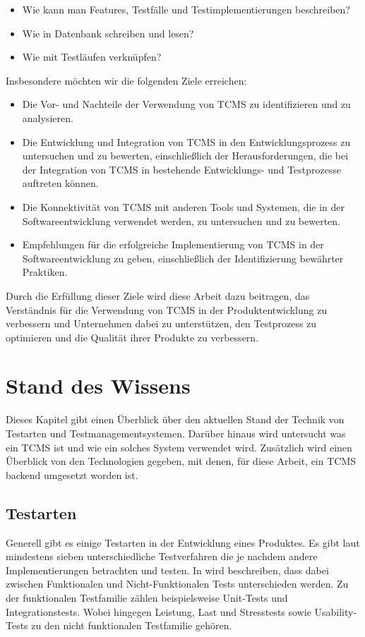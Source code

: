 \documentclass[a4paper, fontsize=11pt, parskip=half, twoside]{scrreprt}
\begin{document}
	\begin{itemize}
		\item Wie kann man Features, Testfälle und Testimplementierungen beschreiben? 
		\item Wie in Datenbank schreiben und lesen? 
		\item Wie mit Testläufen verknüpfen?
	\end{itemize}
	
	Insbesondere möchten wir die folgenden Ziele erreichen:
	
	\begin{itemize}
		\item Die Vor- und Nachteile der Verwendung von \ac{TCMS} zu identifizieren und zu analysieren.
		\item Die Entwicklung und Integration von \ac{TCMS} in den Entwicklungsprozess zu untersuchen und zu bewerten, einschließlich der Herausforderungen, die bei der Integration von \ac{TCMS} in bestehende Entwicklungs- und Testprozesse auftreten können.
		\item Die Konnektivität von \ac{TCMS} mit anderen Tools und Systemen, die in der Softwareentwicklung verwendet werden, zu untersuchen und zu bewerten.
		\item Empfehlungen für die erfolgreiche Implementierung von \ac{TCMS} in der Softwareentwicklung zu geben, einschließlich der Identifizierung bewährter Praktiken.
	\end{itemize}
	
	Durch die Erfüllung dieser Ziele wird diese Arbeit dazu beitragen, das Verständnis für die Verwendung von \ac{TCMS} in der Produktentwicklung zu verbessern und Unternehmen dabei zu unterstützen, den Testprozess zu optimieren und die Qualität ihrer Produkte zu verbessern.
	
	
	
	\chapter{Stand des Wissens}
	Dieses Kapitel gibt einen Überblick über den aktuellen Stand der Technik von Testarten und Testmanagementsystemen. 
	Darüber hinaus wird untersucht was ein \acl{TCMS} ist und wie ein solches System verwendet wird.
	Zusätzlich wird einen Überblick von den Technologien gegeben, mit denen, für diese Arbeit, ein \ac{TCMS} backend umgesetzt worden ist.
	
	
	\section{Testarten} \label{sec:testtypes}
	Generell gibt es einige Testarten in der Entwicklung eines Produktes. 
	Es gibt laut \textcite{atlassian_unterschiedlichen_nodate} mindestens sieben unterschiedliche Testverfahren die je nachdem andere Implementierungen betrachten und testen.
	In \textcite{noauthor_software_nodate} wird beschreiben, dass dabei zwischen Funktionalen und Nicht-Funktionalen Tests unterschieden werden.
	Zu der funktionalen Testfamilie zählen beispielsweise Unit-Tests und Integrationstests.
	Wobei hingegen Leistung, Last und Stresstests sowie Usability-Tests zu den nicht funktionalen Testfamilie gehören.
	
\end{document}

